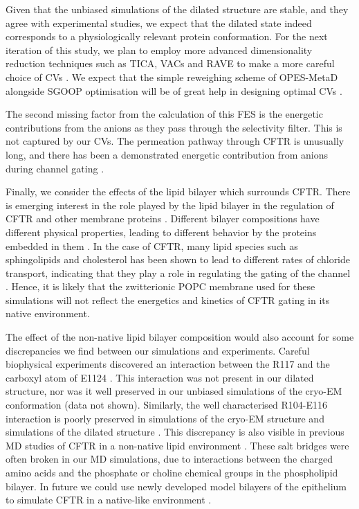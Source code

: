 Given that the unbiased simulations of the dilated structure are stable, and they agree with experimental studies, we expect that the dilated state indeed corresponds to a physiologically relevant protein conformation. For the next iteration of this study, we plan to employ more advanced dimensionality reduction techniques such as TICA, VACs and RAVE to make a more careful choice of CVs \cite{brotzakis2019, noe2001, schultze2021, brotzakis2019, ribeiro2018}. We expect that the simple reweighing scheme of OPES-MetaD alongside SGOOP optimisation will be of great help in designing optimal CVs \cite{invernizzi2020, invernizzi2022, smith2018, tiwary2016b}. 

The second missing factor from the calculation of this FES is the energetic contributions from the anions as they pass through the selectivity filter. This is not captured by our CVs. The permeation pathway through CFTR is unusually long, and there has been a demonstrated energetic contribution from anions during channel gating \cite{gong2004, gong2003, gong2003a, tabcharani1993, zhou2002, sorum2015, yeh2015}. 

Finally, we consider the effects of the lipid bilayer which surrounds CFTR. There is emerging interest in the role played by the lipid bilayer in the regulation of CFTR and other membrane proteins \cite{cottrill2020, lin2022, kapoor2021, farinha2018, cui2020}. Different bilayer compositions have different physical properties, leading to different behavior by the proteins embedded in them \cite{hickey2011}. In the case of CFTR, many lipid species such as sphingolipids and cholesterol has been shown to lead to different rates of chloride transport, indicating that they play a role in regulating the gating of the channel \cite{aureli2016, farinha2018, cottrill2020}. Hence, it is likely that the zwitterionic POPC membrane used for these simulations will not reflect the energetics and kinetics of CFTR gating in its native environment.

The effect of the non-native lipid bilayer composition would also account for some discrepancies we find between our simulations and experiments. Careful biophysical experiments discovered an interaction between the R117 and the carboxyl atom of E1124 \cite{simon2021}. This interaction was not present in our dilated structure, nor was it well preserved in our unbiased simulations of the cryo-EM conformation (data not shown). Similarly, the well characterised R104-E116 interaction is poorly preserved in simulations of the cryo-EM structure and simulations of the dilated structure \cite{cui2014}. This discrepancy is also visible in previous MD studies of CFTR in a non-native lipid environment \cite{zeng2021}. These salt bridges were often broken in our MD simulations, due to interactions between the charged amino acids and the phosphate or choline chemical groups in the phospholipid bilayer. In future we could use newly developed model bilayers of the epithelium to simulate CFTR in a native-like environment \cite{wilson2021}. 

